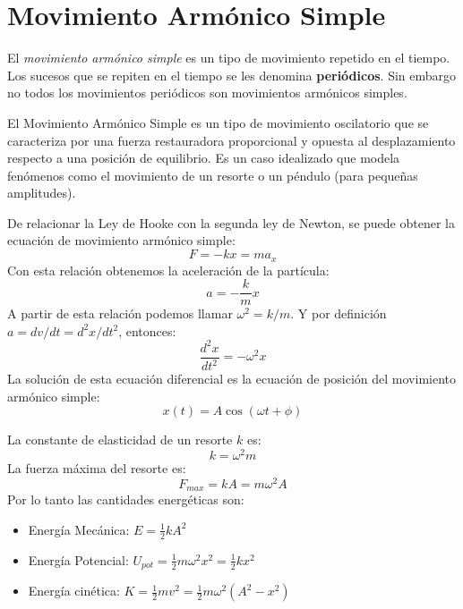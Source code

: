 \section{Movimiento Armónico Simple}
\label{sec:mas}

El \textit{movimiento armónico simple} es un tipo de movimiento repetido en el tiempo. Los sucesos que se repiten en el tiempo se les denomina \textbf{periódicos}. Sin embargo no todos los movimientos periódicos son movimientos armónicos simples.

El Movimiento Armónico Simple es un tipo de movimiento oscilatorio que se caracteriza por una fuerza restauradora proporcional y opuesta al desplazamiento respecto a una posición de equilibrio. Es un caso idealizado que modela fenómenos como el movimiento de un resorte o un péndulo (para pequeñas amplitudes).

\begin{tcolorbox}[remember, title=M.A.S. a partir de la Ley de Hooke]
  De relacionar la Ley de Hooke con la segunda ley de Newton, se puede obtener la ecuación de movimiento armónico simple:
  \[
    F = -kx = m a_x
  \]
  Con esta relación obtenemos la aceleración de la partícula:
  \[
    a = -\frac{k}{m} x 
  \]
  A partir de esta relación podemos llamar \(\omega^2 = k/m\). Y por definición \(a = dv/dt = d^2x/dt^2\), entonces:
  \[
    \boxed{\frac{d^2x}{dt^2} = -\omega^2 x}
  \]
  La solución de esta ecuación diferencial es la ecuación de posición del movimiento armónico simple:
  \[
    x(t) = A\cos(\omega t + \phi)
  \]
\end{tcolorbox}

\begin{tcolorbox}[remember, title=Cantidades a partir de la definición]
  La constante de elasticidad de un resorte \(k\) es:
  \[
    k = \omega^2 m
  \]
  La fuerza máxima del resorte es:
  \[
    F_{max} = kA = m \omega^2 A
  \]
  Por lo tanto las cantidades energéticas son:
  \begin{itemize}
    \item Energía Mecánica: \( E = \frac{1}{2} kA^2 \)
    \item Energía Potencial: \( U_{pot} = \frac{1}{2} m \omega^2 x^2 = \frac{1}{2} kx^2 \)
    \item Energía cinética: \( K = \frac{1}{2} m v^2 = \frac{1}{2} m \omega^2 (A^2 - x^2) \)
  \end{itemize}
\end{tcolorbox}

